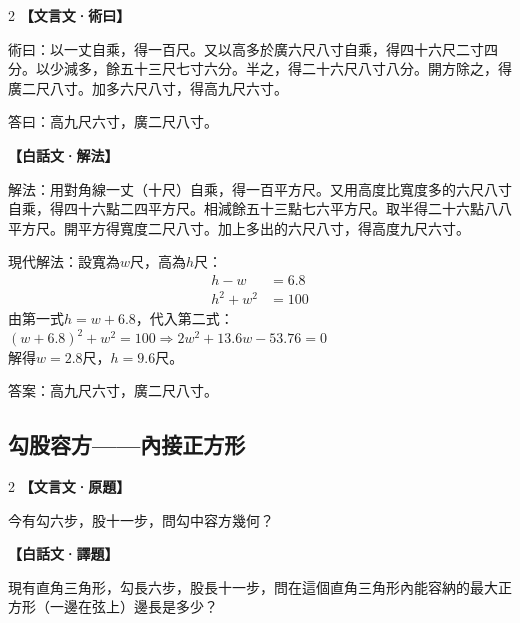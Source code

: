 \documentclass[11pt,a4paper]{article}
\newcommand{\zhc}{}[1]{{\CJKfamily{\CJKrmdefault}#1}}  %
\newcommand{\zhm}[1]{{\CJKfamily{\CJKrmdefault}#1}}  %
\newenvironment{prob bilingual}[1][]{%
  \begin{paracol}{2}%
  \setlength{\columnseprule}{0.4pt}%
}{%
  \end{paracol}%
  \medskip%
}
\begin{document}
\medskip

\begin{paracol}{2}
\switchcolumn[0]
\noindent\textbf{\textcolor{notecolor}{\zhc{【文言文·術曰】}}}\par\smallskip
\zhc{
術曰：以一丈自乘，得一百尺。又以高多於廣六尺八寸自乘，得四十六尺二寸四分。以少減多，餘五十三尺七寸六分。半之，得二十六尺八寸八分。開方除之，得廣二尺八寸。加多六尺八寸，得高九尺六寸。

答曰：高九尺六寸，廣二尺八寸。
}

\switchcolumn[1]
\noindent\textbf{\textcolor{notecolor}{\zhm{【白話文·解法】}}}\par\smallskip
\zhm{
解法：用對角線一丈（十尺）自乘，得一百平方尺。又用高度比寬度多的六尺八寸自乘，得四十六點二四平方尺。相減餘五十三點七六平方尺。取半得二十六點八八平方尺。開平方得寬度二尺八寸。加上多出的六尺八寸，得高度九尺六寸。

現代解法：設寬為$w$尺，高為$h$尺：
\begin{align*}
h - w &= 6.8 \\
h^2 + w^2 &= 100
\end{align*}
由第一式$h = w + 6.8$，代入第二式：
$(w + 6.8)^2 + w^2 = 100 \Rightarrow 2w^2 + 13.6w - 53.76 = 0$\\
解得$w = 2.8$尺，$h = 9.6$尺。

答案：高九尺六寸，廣二尺八寸。
}
\end{paracol}

\vspace{0.5cm}

\subsection{\zhc{勾股容方——內接正方形}}

\begin{paracol}{2}
\switchcolumn[0]
\noindent\textbf{\textcolor{notecolor}{\zhc{【文言文·原題】}}}\par\smallskip
\zhc{
今有勾六步，股十一步，問勾中容方幾何？
}

\switchcolumn[1]
\noindent\textbf{\textcolor{notecolor}{\zhm{【白話文·譯題】}}}\par\smallskip
\zhm{
現有直角三角形，勾長六步，股長十一步，問在這個直角三角形內能容納的最大正方形（一邊在弦上）邊長是多少？
}
\end{paracol}

\medskip
\end{document}
